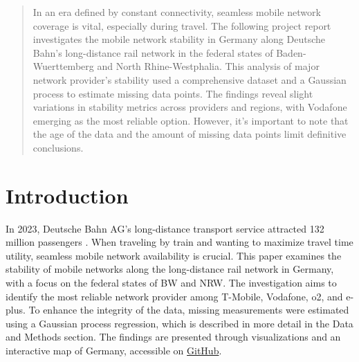 \documentclass{article}
\theoremstyle{plain}
\theoremstyle{definition}
\theoremstyle{remark}
\begin{document}

\printAffiliationsAndNotice{\icmlEqualContribution} %

\begin{abstract}
In an era defined by constant connectivity, seamless mobile network coverage is vital, especially during travel. The following project report investigates the mobile network stability in Germany along Deutsche Bahn's long-distance rail network in the federal states of Baden-Wuerttemberg and North Rhine-Westphalia. This analysis of  major network provider's stability used a comprehensive dataset and a Gaussian process to estimate missing data points. The findings reveal slight variations in stability metrics across providers and regions, with Vodafone emerging as the most reliable option. However, it's important to note that the age of the data and the amount of missing data points limit definitive conclusions.
\end{abstract}
\section{Introduction}\label{sec:intro}
In 2023, Deutsche Bahn AG's long-distance transport service attracted 132 million passengers \citep{deutschebahn2022}. When traveling by train and wanting to maximize travel time utility, seamless mobile network availability is crucial. This paper examines the stability of mobile networks along the long-distance rail network in Germany, with a focus on the federal states of \gls*{BW} and \gls*{NRW}. The investigation aims to identify the most reliable network provider among T-Mobile, Vodafone, o2, and e-plus.  To enhance the integrity of the data, missing measurements were estimated using a Gaussian process regression, which is described in more detail in the Data and Methods section. The findings are presented through visualizations and an interactive map of Germany, accessible on \href{https://github.com/JonasFluck/DBNet.git}{GitHub}.

\end{document}
